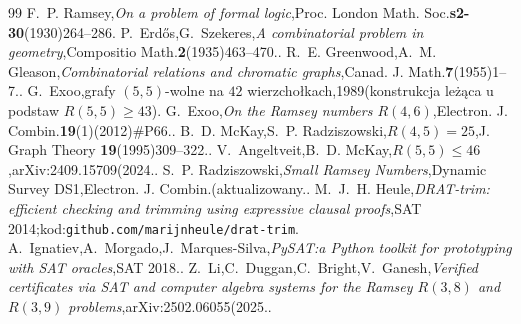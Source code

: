 \documentclass[11pt]{article}
\theoremstyle{definition}
\theoremstyle{plain}
\newcommand{\R}[2]{\ensuremath{R(#1,#2)}}
\begin{document}
\begin{thebibliography}{99}
 F.~P. Ramsey,\emph{On a problem of formal logic},Proc. London Math. Soc.\textbf{s2-30}(1930)264--286.
 P.~Erd\H{o}s,G.~Szekeres,\emph{A combinatorial problem in geometry},Compositio Math.\textbf{2}(1935)463--470..
 R.~E. Greenwood,A.~M. Gleason,\emph{Combinatorial relations and chromatic graphs},Canad. J. Math.\textbf{7}(1955)1--7..
 G.~Exoo,grafy $(5,5)$-wolne na $42$ wierzchołkach,1989(konstrukcja leżąca u podstaw $\R{5}{5} \ge 43$).
 G.~Exoo,\emph{On the Ramsey numbers $R(4,6)$},Electron. J. Combin.\textbf{19}(1)(2012)\#P66..
 B.~D. McKay,S.~P. Radziszowski,\emph{$R(4,5) = 25$},J. Graph Theory \textbf{19}(1995)309--322..
 V.~Angeltveit,B.~D. McKay,\emph{$R(5,5) \le 46$},arXiv:2409.15709(2024..
 S.~P. Radziszowski,\emph{Small Ramsey Numbers},Dynamic Survey DS1,Electron. J. Combin.(aktualizowany..
 M.~J.~H. Heule,\emph{DRAT-trim: efficient checking and trimming using expressive clausal proofs},SAT 2014;kod:\texttt{github.com/marijnheule/drat-trim}.
 A.~Ignatiev,A.~Morgado,J.~Marques-Silva,\emph{PySAT:a Python toolkit for prototyping with SAT oracles},SAT 2018..
 Z.~Li,C.~Duggan,C.~Bright,V.~Ganesh,\emph{Verified certificates via SAT and computer algebra systems for the Ramsey $R(3,8)$ and $R(3,9)$ problems},arXiv:2502.06055(2025..
\end{thebibliography}
\end{document}
